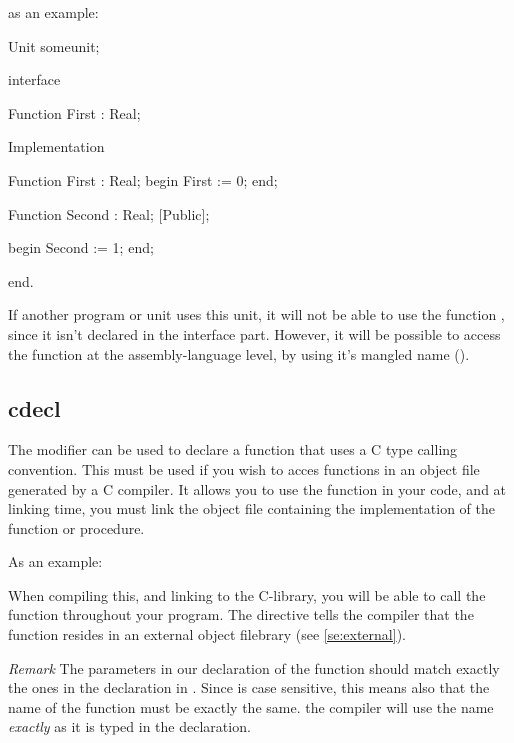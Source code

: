\documentclass{report}
\begin{document}
as an example:
\begin{listing}
Unit someunit;

interface

Function First : Real;

Implementation

Function First : Real;
begin
  First := 0;
end;

Function Second : Real; [Public];

begin
  Second := 1;
end;

end.
\end{listing}
If another program or unit uses this unit, it will not be able to use the
function , since it isn't declared in the interface part.
However, it will be possible to access the function  at the
assembly-language level, by using it's mangled name (\progref).

\subsection{cdecl}
\label{se:cdecl}
The  modifier can be used to declare a function that uses a C
type calling convention. This must be used if you wish to acces functions in
an object file generated by a C compiler. It allows you to use the function in
your code, and at linking time, you must link the object file containing the
 implementation of the function or procedure.

As an example:
When compiling this, and linking to the C-library, you will be able to call
the  function throughout your program. The 
directive tells the compiler that the function resides in an external
object filebrary (see \ref{se:external}). 

{\em Remark} The parameters in our declaration of the  function should 
match exactly the ones in the declaration in . Since  is case 
sensitive, this means also that the name of the
function must be exactly the same. the \fpc compiler will use the name {\em
exactly} as it is typed in the declaration.
\end{document}
